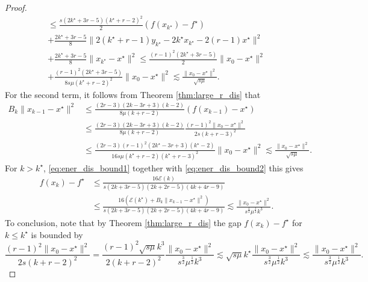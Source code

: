 \documentclass[twoside,11pt]{article}
\def\half{\frac{1}{2}}
\begin{document}
\begin{proof}
\begin{multline}
\le \frac{s(2k^\star+3r-5)(k^\star+r-2)^2}{2}(f(x_{k^\star}) - f^\star) \\
+ \frac{2k^\star+3r-5}{8}\|2(k^\star+r-1)y_{k^\star} - 2k^\star x_{k^\star} - 2(r-1)x^\star\|^2\\ + \frac{2k^\star+3r-5}{8}\|x_{k^\star} - x^\star\|^2 \le \frac{(r-1)^2(2k^\star+3r-5)}{2}\|x_0 - x^\star\|^2 \\+ \frac{(r-1)^2(2k^\star+3r-5)}{8s\mu(k^\star+r-2)^2}\|x_0 - x^\star\|^2 \lesssim \frac{\|x_0-x^\star\|^2}{\sqrt{s\mu}}.
\end{multline}
For the second term, it follows from Theorem \ref{thm:large_r_dis} that
\begin{equation}\label{eq:ener_dis_bound2}
\begin{aligned}
B_k\|x_{k-1} - x^\star\|^2 &\le  \frac{(2r-3)(2k-3r+3)(k-2)}{8\mu(k+r-2)}(f(x_{k-1}) - x^\star)\\
&\le \frac{(2r-3)(2k-3r+3)(k-2)}{8\mu(k+r-2)}\frac{(r-1)^2\|x_0-x^\star\|^2}{2s(k+r-3)^2} \\
&\le \frac{(2r-3)(r-1)^2(2k^\star-3r+3)(k^\star-2)}{16s\mu(k^\star+r-2)(k^\star+r-3)^2} \|x_0-x^\star\|^2 \lesssim  \frac{\|x_0-x^\star\|^2}{\sqrt{s\mu}}.
\end{aligned}
\end{equation}
For $k > k^\star$, \eqref{eq:ener_dis_bound1} together with \eqref{eq:ener_dis_bound2} this gives
\begin{equation}\nonumber
\begin{aligned}
f(x_k)-f^\star &\le \frac{16\mathcal{E}(k)}{s(2k+3r-5)(2k+2r-5)(4k+4r-9)}\\
&\le \frac{16(\mathcal{E}(k^\star) + B_k\|x_{k-1}-x^\star\|^2)}{s(2k+3r-5)(2k+2r-5)(4k+4r-9)} \lesssim \frac{\|x_0 - x^\star\|^2}{s^{\frac{3}{2}}\mu^{\half}k^3}.
\end{aligned}
\end{equation}
To conclusion, note that by Theorem \ref{thm:large_r_dis} the gap
$f(x_k) - f^\star$ for $k \le k^\star$ is bounded by
\begin{equation}\nonumber
\frac{(r-1)^2\|x_0-x^\star\|^2}{2s(k+r-2)^2} = \frac{(r-1)^2\sqrt{s\mu}k^3}{2(k+r-2)^2}\frac{\|x_0 - x^\star\|^2}{s^{\frac{3}{2}}\mu^{\half}k^3} \lesssim \sqrt{s\mu}k^\star\frac{\|x_0 - x^\star\|^2}{s^{\frac{3}{2}}\mu^{\half}k^3} \lesssim \frac{\|x_0 - x^\star\|^2}{s^{\frac{3}{2}}\mu^{\half}k^3}.
\end{equation}


\end{proof}
\end{document}
